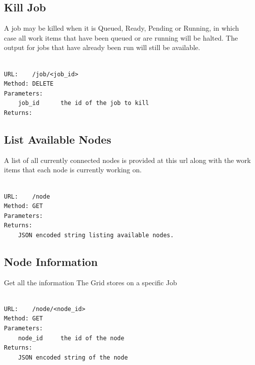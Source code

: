 \subsection{Kill Job}
\label{killjob}

A job may be killed when it is Queued, Ready, Pending or Running, in which case all work items that have been queued or are running will be halted. The output for jobs that have already been run will still be available.

\begin{adjustwidth}{2.5em}{2.5em}
\begin{verbatim}

URL:    /job/<job_id>
Method: DELETE
Parameters: 
    job_id      the id of the job to kill
Returns:

\end{verbatim}
\end{adjustwidth}

\subsection{List Available Nodes}
\label{listavailablenodes}

A list of all currently connected nodes is provided at this url along with the work items that each node is currently working on.

\begin{adjustwidth}{2.5em}{2.5em}
\begin{verbatim}

URL:    /node
Method: GET
Parameters:
Returns:    
    JSON encoded string listing available nodes.

\end{verbatim}
\end{adjustwidth}

\subsection{Node Information}
\label{nodeinformation}

Get all the information The Grid stores on a specific Job

\begin{adjustwidth}{2.5em}{2.5em}
\begin{verbatim}

URL:    /node/<node_id>
Method: GET
Parameters:
    node_id     the id of the node
Returns:    
    JSON encoded string of the node

\end{verbatim}
\end{adjustwidth}

